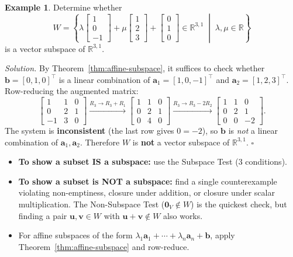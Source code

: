 \documentclass[11pt, a4paper, notitlepage]{report}
\theoremstyle{definition}
\newtheorem{example}[theorem]{Example}
\theoremstyle{remark}
\begin{document}
\begin{example}\label{ex:affine-column-space}
Determine whether
\[
  W = \left\{ \lambda \begin{bmatrix}1\\0\\-1\end{bmatrix} + \mu \begin{bmatrix}1\\2\\3\end{bmatrix} + \begin{bmatrix}0\\1\\0\end{bmatrix} \in \mathbb{R}^{3,1} \;\middle|\; \lambda, \mu \in \mathbb{R} \right\}
\]
is a vector subspace of $\mathbb{R}^{3,1}$.

\emph{Solution.} By Theorem~\ref{thm:affine-subspace}, it suffices to check whether $\mathbf{b} = [0, 1, 0]^\top$ is a linear combination of $\mathbf{a}_1 = [1, 0, -1]^\top$ and $\mathbf{a}_2 = [1, 2, 3]^\top$. Row-reducing the augmented matrix:
\[
  \begin{bmatrix} 1 & 1 & 0 \\ 0 & 2 & 1 \\ -1 & 3 & 0 \end{bmatrix}
  \xrightarrow{R_3 \to R_3 + R_1}
  \begin{bmatrix} 1 & 1 & 0 \\ 0 & 2 & 1 \\ 0 & 4 & 0 \end{bmatrix}
  \xrightarrow{R_3 \to R_3 - 2R_2}
  \begin{bmatrix} 1 & 1 & 0 \\ 0 & 2 & 1 \\ 0 & 0 & -2 \end{bmatrix}.
\]
The system is \textbf{inconsistent} (the last row gives $0 = -2$), so $\mathbf{b}$ is \emph{not} a linear combination of $\mathbf{a}_1, \mathbf{a}_2$. Therefore $W$ is \textbf{not} a vector subspace of $\mathbb{R}^{3,1}$. $\square$
\end{example}

\begin{examtip}[title={Exam Tip: Strategy for Subspace Problems}]
\begin{itemize}
  \item \textbf{To show a subset IS a subspace:} use the Subspace Test (3 conditions).
  \item \textbf{To show a subset is NOT a subspace:} find a single counterexample violating non-emptiness, closure under addition, or closure under scalar multiplication. The Non-Subspace Test ($\mathbf{0}_V \notin W$) is the quickest check, but finding a pair $\mathbf{u}, \mathbf{v} \in W$ with $\mathbf{u} + \mathbf{v} \notin W$ also works.
  \item For affine subspaces of the form $\lambda_1\mathbf{a}_1 + \cdots + \lambda_n \mathbf{a}_n + \mathbf{b}$, apply Theorem~\ref{thm:affine-subspace} and row-reduce.
\end{itemize}
\end{examtip}
\end{document}

